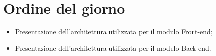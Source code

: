 \section{Ordine del giorno}

\begin{itemize}
\item Presentazione dell'architettura utilizzata per il modulo Front-end;
\item Presentazione dell'architettura utilizzata per il modulo Back-end.
\end{itemize}
